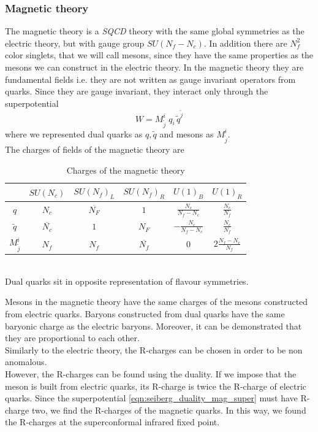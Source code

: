 \subsubsection{Magnetic theory}
The magnetic theory is a \emph{SQCD} theory with the same global symmetries as the electric theory, but with gauge group $SU(N_f - N_c)$. 
In addition there are $N_f^2$ color singlets, that we will call mesons, since they have the same properties as the mesons we can construct in the electric theory.
In the magnetic theory they are fundamental fields i.e. they are not written as gauge invariant operators from quarks. 
Since they are gauge invariant, they interact only through the superpotential
\begin{equation}
 W  = M^i_{\tilde{j}} \; q_i \, \tilde{q}^{\tilde{j}}
 \label{eqn:seiberg_duality_mag_super}
\end{equation}
where we represented dual quarks as $q,\tilde{q}$ and mesons as $M^i_{\tilde{j}} $.\\
The charges of fields of the magnetic theory are
\begin{table}[h]
 \begin{tabular}{c | c |  c c c c }
 & $SU(N_c) $& $SU(N_f)_L$  &$SU(N_f)_R $  & $U(1)_B$ &  $U(1)_R$ \\
\hline
$q$ & $N_c$ & $\overline{N_F}$ & $1$   &  $ \frac{N_c}{N_f-N_c} $  & $ \frac{N_c}{N_f}$  \\
$\tilde{q}$ &$\overline{N_c} $ &  $1$ & ${ N_F}$   & $- \frac{N_c}{N_f-N_c}$   &  $ \frac{N_c}{N_f}$   \\	 
$M^i_{\tilde{j}} $ & $N_f$ & $N_f$ & $\overline{N_f} $ & $0$ & $ 2 \frac{N_f - N_c}{N_f} $
 \end{tabular}
	\centering
 \caption{Charges of the magnetic theory}
\end{table}\\
Dual quarks sit in opposite representation of flavour symmetries. 

Mesons in the magnetic theory have the same charges of the mesons constructed from electric quarks.
Baryons constructed from dual quarks have the same baryonic charge as the electric baryons.
Moreover, it can be demonstrated that they are proportional to each other.\\
Similarly to the electric theory, the R-charges can be chosen in order to be non anomalous.\\
However, the R-charges can be found using the duality.
If we impose that the meson is built from electric quarks, its R-charge is twice the R-charge of electric quarks.
Since the superpotential \eqref{eqn:seiberg_duality_mag_super} must have R-charge two, we find the R-charges of the magnetic quarks.
In this way, we found the R-charges at the superconformal infrared fixed point.

